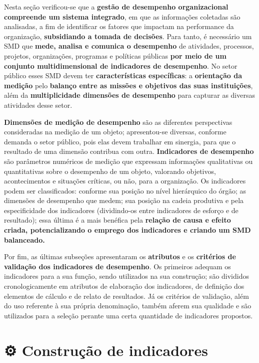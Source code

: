 \documentclass[
  letterpaper,
  DIV=11,
  numbers=noendperiod]{scrreprt}
\begin{document}

Nesta seção verificou-se que a \textbf{gestão de desempenho
organizacional compreende um sistema integrado}, em que as informações
coletadas são analisadas, a fim de identificar os fatores que impactam
na performance da organização, \textbf{subsidiando a tomada de
decisões}. Para tanto, é necessário um SMD que \textbf{mede, analisa e
comunica o desempenho} de atividades, processos, projetos, organizações,
programas e políticas públicas \textbf{por meio de um conjunto
multidimensional de indicadores de desempenho}. No setor público esses
SMD devem ter \textbf{características específicas}: a \textbf{orientação
da medição} pelo \textbf{balanço entre as missões e objetivos das suas
instituições}, além da \textbf{multiplicidade dimensões de desempenho}
para capturar as diversas atividades desse setor.

\textbf{Dimensões de medição de desempenho} são as diferentes
perspectivas consideradas na medição de um objeto; apresentou-se
diversas, conforme demanda o setor público, pois elas devem trabalhar em
sinergia, para que o resultado de uma dimensão contribua com outra.
\textbf{Indicadores de desempenho} são parâmetros numéricos de medição
que expressam informações qualitativas ou quantitativas sobre o
desempenho de um objeto, valorando objetivos, acontecimentos e situações
críticas, ou não, para a organização. Os indicadores podem ser
classificados: conforme sua posição no nível hierárquico do órgão; as
dimensões de desempenho que medem; sua posição na cadeia produtiva e
pela especificidade dos indicadores (dividindo-os entre indicadores de
esforço e de resultado); essa última é a mais benéfica pela
\textbf{relação de causa e efeito criada, potencializando o emprego dos
indicadores e criando um SMD balanceado.}

Por fim, as últimas subseções apresentaram os \textbf{atributos} e os
\textbf{critérios de validação dos indicadores de desempenho}. Os
primeiros adequam os indicadores para a sua função, sendo utilizados na
sua construção; são divididos cronologicamente em atributos de
elaboração dos indicadores, de definição dos elementos de cálculo e de
relato de resultados. Já os critérios de validação, além do uso
referente à sua própria denominação, também aferem sua qualidade e são
utilizados para a seleção perante uma certa quantidade de indicadores
propostos.

\part{⚙️ Construção de indicadores}
\end{document}
